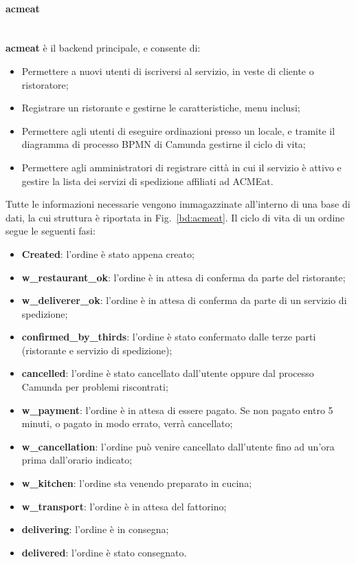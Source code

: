 \documentclass[11pt]{article} %
\begin{document}
\paragraph{acmeat}\mbox{}\\
\textbf{acmeat} è il backend principale, e consente di:
\begin{itemize}
\item Permettere a nuovi utenti di iscriversi al servizio, in veste di cliente o ristoratore;
\item Registrare un ristorante e gestirne le caratteristiche, menu inclusi;
\item Permettere agli utenti di eseguire ordinazioni presso un locale, e tramite il diagramma di processo BPMN di Camunda gestirne il ciclo di vita;
\item Permettere agli amministratori di registrare città in cui il servizio è attivo e gestire la lista dei servizi di spedizione affiliati ad ACMEat.
\end{itemize}
Tutte le informazioni necessarie vengono immagazzinate all'interno di una base di dati, la cui struttura è riportata in Fig.~\ref{bd:acmeat}. Il ciclo di vita di un ordine segue le seguenti fasi:
\begin{itemize}
\item \textbf{Created}: l'ordine è stato appena creato;
\item \textbf{w\_restaurant\_ok}: l'ordine è in attesa di conferma da parte del ristorante;
\item \textbf{w\_deliverer\_ok}: l'ordine è in attesa di conferma da parte di un servizio di spedizione;
\item \textbf{confirmed\_by\_thirds}: l'ordine è stato confermato dalle terze parti (ristorante e servizio di spedizione);
\item \textbf{cancelled}: l'ordine è stato cancellato dall'utente oppure dal processo Camunda per problemi riscontrati;
\item \textbf{w\_payment}: l'ordine è in attesa di essere pagato. Se non pagato entro 5 minuti, o pagato in modo errato, verrà cancellato;
\item \textbf{w\_cancellation}: l'ordine può venire cancellato dall'utente fino ad un'ora prima dall'orario indicato;
\item \textbf{w\_kitchen}: l'ordine sta venendo preparato in cucina;
\item \textbf{w\_transport}: l'ordine è in attesa del fattorino;
\item \textbf{delivering}: l'ordine è in consegna;
\item \textbf{delivered}: l'ordine è stato consegnato.
\end{itemize}
\end{document}

